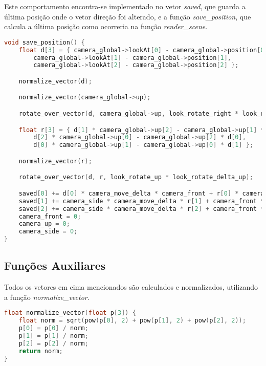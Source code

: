 \documentclass[14pt, a4 paper]{report}
\begin{document}
Este comportamento encontra-se implementado no vetor \textit{saved}, que guarda a última posição onde o vetor direção foi alterado, e a função \textit{save\_position}, que calcula a última posição como ocorreria na função \textit{render\_scene}.

\begin{lstlisting}[language = c++]
void save_position() {
	float d[3] = { camera_global->lookAt[0] - camera_global->position[0],
		camera_global->lookAt[1] - camera_global->position[1],
		camera_global->lookAt[2] - camera_global->position[2] };

	normalize_vector(d);

	normalize_vector(camera_global->up);

	rotate_over_vector(d, camera_global->up, look_rotate_right * look_rotate_delta_right);

	float r[3] = { d[1] * camera_global->up[2] - camera_global->up[1] * d[2],
		d[2] * camera_global->up[0] - camera_global->up[2] * d[0],
		d[0] * camera_global->up[1] - camera_global->up[0] * d[1] };

	normalize_vector(r);

	rotate_over_vector(d, r, look_rotate_up * look_rotate_delta_up);

	saved[0] += d[0] * camera_move_delta * camera_front + r[0] * camera_move_delta * camera_side + camera_up * camera_move_delta * camera_global->up[0];
	saved[1] += camera_side * camera_move_delta * r[1] + camera_front * camera_move_delta * d[1] + camera_up * camera_move_delta * camera_global->up[1];
	saved[2] += camera_side * camera_move_delta * r[2] + camera_front * camera_move_delta * d[2] + camera_up * camera_move_delta * camera_global->up[2];
	camera_front = 0;
	camera_up = 0;
	camera_side = 0;
}
\end{lstlisting}

\subsection{Funções Auxiliares}

Todos os vetores em cima mencionados são calculados e normalizados, utilizando a função \textit{normalize\_vector}.

\begin{lstlisting}[language = c++]
float normalize_vector(float p[3]) {
	float norm = sqrt(pow(p[0], 2) + pow(p[1], 2) + pow(p[2], 2));
	p[0] = p[0] / norm;
	p[1] = p[1] / norm;
	p[2] = p[2] / norm;
	return norm;
}
\end{lstlisting}
\end{document}
